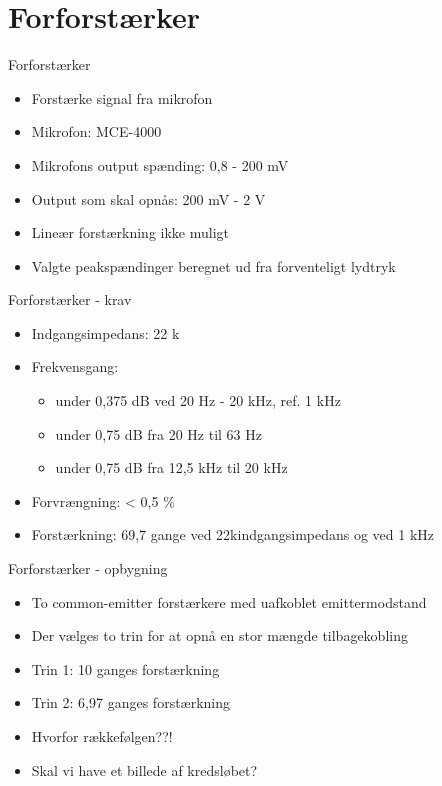 \section{Forforstærker}

\begin{frame}{Forforstærker}
\begin{itemize}
\item Forstærke signal fra mikrofon
\item Mikrofon: MCE-4000
\item Mikrofons output spænding: 0,8 - 200 mV
\item Output som skal opnås: 200 mV - 2 V
\item Lineær forstærkning ikke muligt
\item Valgte peakspændinger beregnet ud fra forventeligt lydtryk
\end{itemize}
\end{frame}

\begin{frame}{Forforstærker - krav}
\begin{itemize}
\item Indgangsimpedans: 22 k\ohm
\item Frekvensgang: 
\begin{itemize}
\item  under 0,375 dB ved 20 Hz - 20 kHz, ref. 1 kHz 
\item  under 0,75 dB fra 20 Hz til 63 Hz 
\item  under 0,75 dB fra 12,5 kHz til 20 kHz
\end{itemize}
\item Forvrængning: < 0,5 \%
\item Forstærkning: 69,7 gange ved 22k\ohm indgangsimpedans og ved 1 kHz
\end{itemize}
\end{frame}

\begin{frame}{Forforstærker - opbygning}
\begin{itemize}
\item To common-emitter forstærkere med uafkoblet emittermodstand
\item Der vælges to trin for at opnå en stor mængde tilbagekobling
\item Trin 1: 10 ganges forstærkning
\item Trin 2: 6,97 ganges forstærkning
\item Hvorfor rækkefølgen??!
\item Skal vi have et billede af kredsløbet?
\end{itemize}
\end{frame}

